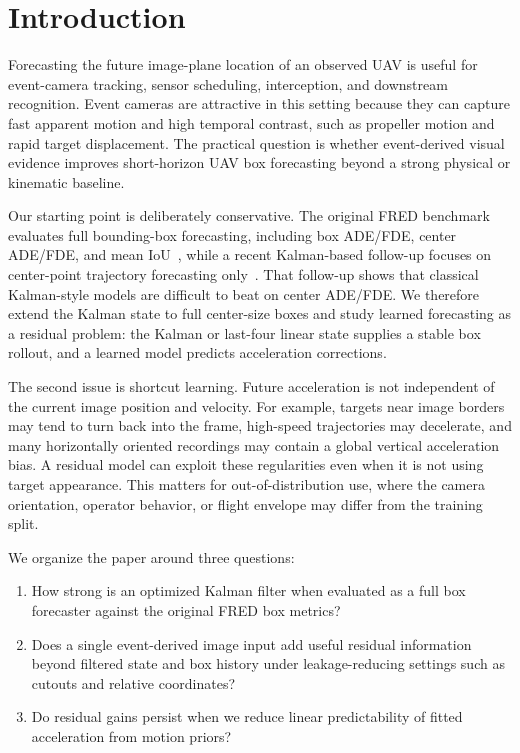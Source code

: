 \section{Introduction}

Forecasting the future image-plane location of an observed UAV is useful for event-camera tracking, sensor scheduling, interception, and downstream recognition. Event cameras are attractive in this setting because they can capture fast apparent motion and high temporal contrast, such as propeller motion and rapid target displacement. The practical question is whether event-derived visual evidence improves short-horizon UAV box forecasting beyond a strong physical or kinematic baseline.

Our starting point is deliberately conservative. The original FRED benchmark evaluates full bounding-box forecasting, including box ADE/FDE, center ADE/FDE, and mean IoU~\cite{magrini_fred_2025}, while a recent Kalman-based follow-up focuses on center-point trajectory forecasting only~\cite{rpm_kalman_2026}. That follow-up shows that classical Kalman-style models are difficult to beat on center ADE/FDE. We therefore extend the Kalman state to full center-size boxes and study learned forecasting as a residual problem: the Kalman or last-four linear state supplies a stable box rollout, and a learned model predicts acceleration corrections.

The second issue is shortcut learning. Future acceleration is not independent of the current image position and velocity. For example, targets near image borders may tend to turn back into the frame, high-speed trajectories may decelerate, and many horizontally oriented recordings may contain a global vertical acceleration bias. A residual model can exploit these regularities even when it is not using target appearance. This matters for out-of-distribution use, where the camera orientation, operator behavior, or flight envelope may differ from the training split.

We organize the paper around three questions:

\begin{enumerate}
  \item How strong is an optimized Kalman filter when evaluated as a full box forecaster against the original FRED box metrics?
  \item Does a single event-derived image input add useful residual information beyond filtered state and box history under leakage-reducing settings such as cutouts and relative coordinates?
  \item Do residual gains persist when we reduce linear predictability of fitted acceleration from motion priors?
\end{enumerate}

